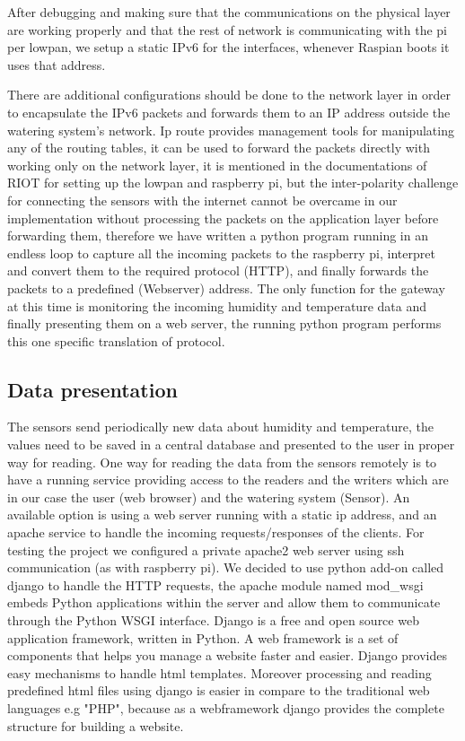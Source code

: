 \documentclass[11pt,paper=a4,parskip=half]{scrartcl}
\begin{document}
 After debugging and making sure that the communications on the physical layer are working properly and that the rest of network is communicating with the pi per lowpan, we setup a static IPv6 for the interfaces, whenever Raspian boots it uses that address. 
 
 There are additional configurations should be done to the network layer in order to encapsulate the IPv6 packets and forwards them to an IP address outside the watering system's network. Ip route provides management tools for manipulating any of the routing tables, it can be used to forward the packets directly with working only on the network layer, it is mentioned in the documentations of RIOT for setting up the lowpan and raspberry pi, but the inter-polarity challenge for connecting the sensors with the internet cannot be overcame in our implementation without processing the packets on the application layer before forwarding them, therefore we have written a python program running in an endless loop to capture all the incoming packets to the raspberry pi, interpret and convert them to the required protocol (HTTP), and finally forwards the packets to a predefined (Webserver) address. The only function for the gateway at this time is monitoring the incoming humidity and temperature data and finally presenting them on a web server, the running python program performs this one specific translation of protocol.

\subsection{Data presentation}

The sensors send periodically new data about humidity and temperature, the values need to be saved in a central database and presented to the user in proper way for reading.
One way for reading the data from the sensors remotely is to have a running service providing access to the readers and the writers which are in our case the user (web browser) and the watering system (Sensor). An available option is using a web server running with a static ip address, and an apache service to handle the incoming requests/responses of the clients. For testing the project we configured a private apache2 web server using ssh communication (as with raspberry pi). We decided to use python add-on called django to handle the HTTP requests, the apache module named mod\_wsgi embeds Python applications within the server and allow them to communicate through the Python WSGI interface. Django is a free and open source web application framework, written in Python. A web framework is a set of components that helps you manage a website faster and easier. Django provides easy mechanisms to handle html templates. Moreover processing and reading predefined html files using django is easier in compare to the traditional web languages e.g "PHP", because as a webframework django provides the complete structure for building a website.  
\end{document}
